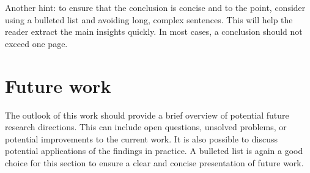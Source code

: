 Another hint: to ensure that the conclusion is concise and to the point, consider using a bulleted list and avoiding long, complex sentences. This will help the reader extract the main insights quickly. In most cases, a conclusion should not exceed one page.

\section{Future work}
\label{sec:futurework}
The outlook of this work should provide a brief overview of potential future research directions. This can include open questions, unsolved problems, or potential improvements to the current work. It is also possible to discuss potential applications of the findings in practice. A bulleted list is again a good choice for this section to ensure a clear and concise presentation of future work.
